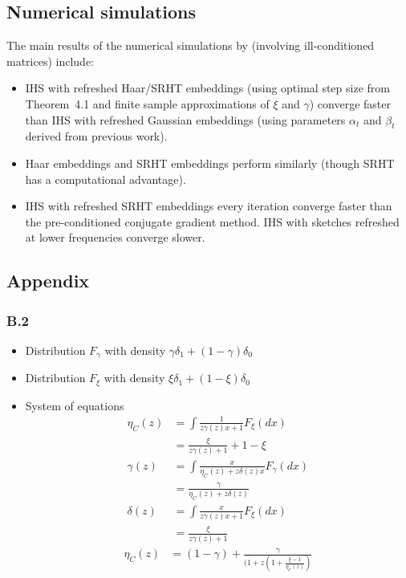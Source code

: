\documentclass[10pt]{article}
\begin{document}
\subsection{Numerical simulations}

The main results of the numerical simulations by \citet{Lacotte:2020} (involving ill-conditioned matrices) include:
\begin{itemize}

\item
IHS with refreshed Haar/SRHT embeddings (using optimal step size from Theorem~4.1 and finite sample approximations of $\xi$ and $\gamma$) converge faster than IHS with refreshed Gaussian embeddings (using parameters $\alpha_t$ and $\beta_t$ derived from previous work).

\item
Haar embeddings and SRHT embeddings perform similarly (though SRHT has a computational advantage).

\item
IHS with refreshed SRHT embeddings every iteration converge faster than the pre-conditioned conjugate gradient method. IHS with sketches refreshed at lower frequencies converge slower.

\end{itemize}


\subsection{Appendix}

\subsubsection{B.2}

\begin{itemize}

\item
Distribution $F_\gamma$ with density $\gamma\delta_1+(1-\gamma)\delta_0$

\item
Distribution $F_\xi$ with density $\xi\delta_1+(1-\xi)\delta_0$

\item
System of equations
\begin{align*}
\eta_C(z) &= \int \frac{1}{z\gamma(z)x+1}F_\xi(dx) \\
&= \frac{\xi}{z\gamma(z)+1} + 1-\xi \\
\gamma(z) &= \int\frac{x}{\eta_C(z)+z\delta(z)x}F_\gamma(dx) \\
&= \frac{\gamma}{\eta_C(z) + z\delta(z)} \\
\delta(z) &= \int\frac{x}{z\gamma(z)x+1}F_\xi(dx) \\
&= \frac{\xi}{z\gamma(z)+1}
\end{align*}
\todo
\begin{align*}
\eta_C(z) &= (1-\gamma) + \frac{\gamma}{(1+z\left(1+\frac{\xi-1}{\eta_C(z)}\right)}
\end{align*}

\end{itemize}
\end{document}
